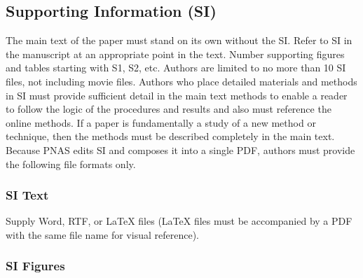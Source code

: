 \documentclass[9pt,twocolumn,twoside]{pnas-new}
\begin{document}

\onecolumn

\subsection*{Supporting Information (SI)}
\FloatBarrier

The main text of the paper must stand on its own without the SI. Refer to SI in the manuscript at an appropriate point in the text. Number supporting figures and tables starting with S1, S2, etc. Authors are limited to no more than 10 SI files, not including movie files. Authors who place detailed materials and methods in SI must provide sufficient detail in the main text methods to enable a reader to follow the logic of the procedures and results and also must reference the online methods. If a paper is fundamentally a study of a new method or technique, then the methods must be described completely in the main text. Because PNAS edits SI and composes it into a single PDF, authors must provide the following file formats only.

\subsubsection*{SI Text}

Supply Word, RTF, or LaTeX files (LaTeX files must be accompanied by a PDF with the same file name for visual reference).

\subsubsection*{SI Figures}
\end{document}
